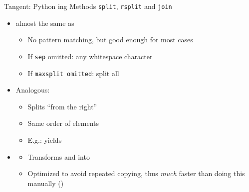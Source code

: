 
\begin{frame}[fragile]{Tangent: Python ing Methods \texttt{split}, \texttt{rsplit} and \texttt{join}}
%
\begin{itemize}
\item {} almost the same as 
	\begin{itemize}
	\item No pattern matching, but good enough for most cases
	\item If \texttt{sep} omitted: any whitespace character
	\item If \texttt{maxsplit omitted}: split all
	\end{itemize}
\pause
\item Analogous: 
	\begin{itemize}
	\item Splits \enquote{from the right}
	\item Same order of elements
	\item E.\;g.:  yields \inPy{["a b", "c", "d"]}
	\end{itemize}
\pause
\item {}
	\begin{itemize}
	\item Transforms  and  into 
	\item Optimized to avoid repeated copying, thus \emph{much} faster than doing this manually ()
	\end{itemize}
\end{itemize}
%
\end{frame}


